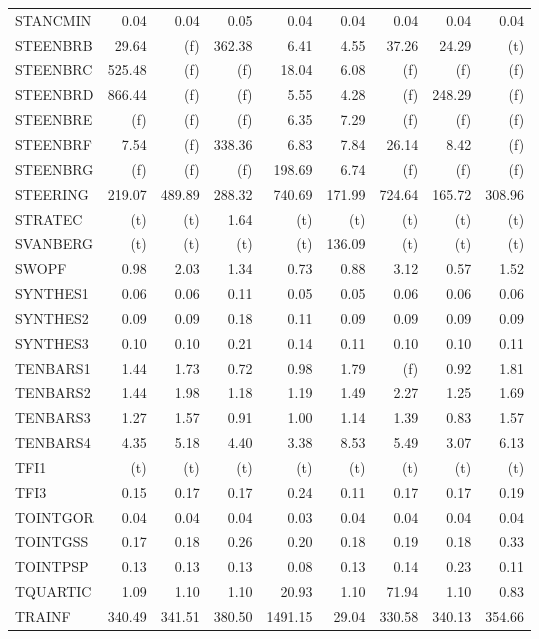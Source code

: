 \documentclass[11pt,twoside]{article}
\begin{document}
{\begin{longtable}[c]{|l|r|r|r|r|r|r|r|r|}
STANCMIN & 0.04 & 0.04 & 0.05 & 0.04 & 0.04 & 0.04 & 0.04 & 0.04 \\
STEENBRB & 29.64 & (f) & 362.38 & 6.41 & 4.55 & 37.26 & 24.29 & (t) \\
STEENBRC & 525.48 & (f) & (f) & 18.04 & 6.08 & (f) & (f) & (f) \\
STEENBRD & 866.44 & (f) & (f) & 5.55 & 4.28 & (f) & 248.29 & (f) \\
STEENBRE & (f) & (f) & (f) & 6.35 & 7.29 & (f) & (f) & (f) \\
STEENBRF & 7.54 & (f) & 338.36 & 6.83 & 7.84 & 26.14 & 8.42 & (f) \\
STEENBRG & (f) & (f) & (f) & 198.69 & 6.74 & (f) & (f) & (f) \\
STEERING & 219.07 & 489.89 & 288.32 & 740.69 & 171.99 & 724.64 & 165.72 & 308.96 \\
STRATEC & (t) & (t) & 1.64 & (t) & (t) & (t) & (t) & (t) \\
SVANBERG & (t) & (t) & (t) & (t) & 136.09 & (t) & (t) & (t) \\
SWOPF & 0.98 & 2.03 & 1.34 & 0.73 & 0.88 & 3.12 & 0.57 & 1.52 \\
SYNTHES1 & 0.06 & 0.06 & 0.11 & 0.05 & 0.05 & 0.06 & 0.06 & 0.06 \\
SYNTHES2 & 0.09 & 0.09 & 0.18 & 0.11 & 0.09 & 0.09 & 0.09 & 0.09 \\
SYNTHES3 & 0.10 & 0.10 & 0.21 & 0.14 & 0.11 & 0.10 & 0.10 & 0.11 \\
TENBARS1 & 1.44 & 1.73 & 0.72 & 0.98 & 1.79 & (f) & 0.92 & 1.81 \\
TENBARS2 & 1.44 & 1.98 & 1.18 & 1.19 & 1.49 & 2.27 & 1.25 & 1.69 \\
TENBARS3 & 1.27 & 1.57 & 0.91 & 1.00 & 1.14 & 1.39 & 0.83 & 1.57 \\
TENBARS4 & 4.35 & 5.18 & 4.40 & 3.38 & 8.53 & 5.49 & 3.07 & 6.13 \\
TFI1 & (t) & (t) & (t) & (t) & (t) & (t) & (t) & (t) \\
TFI3 & 0.15 & 0.17 & 0.17 & 0.24 & 0.11 & 0.17 & 0.17 & 0.19 \\
TOINTGOR & 0.04 & 0.04 & 0.04 & 0.03 & 0.04 & 0.04 & 0.04 & 0.04 \\
TOINTGSS & 0.17 & 0.18 & 0.26 & 0.20 & 0.18 & 0.19 & 0.18 & 0.33 \\
TOINTPSP & 0.13 & 0.13 & 0.13 & 0.08 & 0.13 & 0.14 & 0.23 & 0.11 \\
TQUARTIC & 1.09 & 1.10 & 1.10 & 20.93 & 1.10 & 71.94 & 1.10 & 0.83 \\
TRAINF & 340.49 & 341.51 & 380.50 & 1491.15 & 29.04 & 330.58 & 340.13 & 354.66 \\

\end{longtable}}
\end{document}
